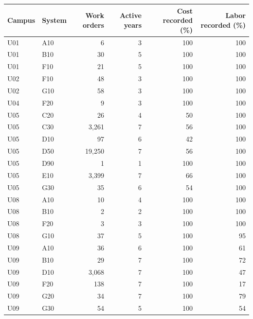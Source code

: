 \begin{tabular}{llrrrr}
\toprule
Campus & System & Work orders & Active years & Cost recorded (\%) & Labor recorded (\%) \\
\midrule
U01 & A10 & 6 & 3 & 100 & 100 \\
U01 & B10 & 30 & 5 & 100 & 100 \\
U01 & F10 & 21 & 5 & 100 & 100 \\
U02 & F10 & 48 & 3 & 100 & 100 \\
U02 & G10 & 58 & 3 & 100 & 100 \\
U04 & F20 & 9 & 3 & 100 & 100 \\
U05 & C20 & 26 & 4 & 50 & 100 \\
U05 & C30 & 3,261 & 7 & 56 & 100 \\
U05 & D10 & 97 & 6 & 42 & 100 \\
U05 & D50 & 19,250 & 7 & 56 & 100 \\
U05 & D90 & 1 & 1 & 100 & 100 \\
U05 & E10 & 3,399 & 7 & 66 & 100 \\
U05 & G30 & 35 & 6 & 54 & 100 \\
U08 & A10 & 10 & 4 & 100 & 100 \\
U08 & B10 & 2 & 2 & 100 & 100 \\
U08 & F20 & 3 & 3 & 100 & 100 \\
U08 & G10 & 37 & 5 & 100 & 95 \\
U09 & A10 & 36 & 6 & 100 & 61 \\
U09 & B10 & 29 & 7 & 100 & 72 \\
U09 & D10 & 3,068 & 7 & 100 & 47 \\
U09 & F20 & 138 & 7 & 100 & 17 \\
U09 & G20 & 34 & 7 & 100 & 79 \\
U09 & G30 & 54 & 5 & 100 & 54 \\
\bottomrule
\end{tabular}
